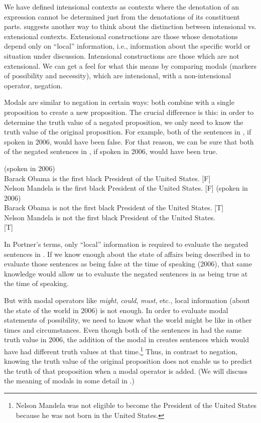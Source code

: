 We have defined intensional contexts as contexts where the denotation of an expression cannot be determined just from the denotations of its constituent parts. \citet[132]{Portner2005} suggests another way to think about the distinction between intensional vs. extensional contexts. Extensional constructions are those whose denotations depend only on “local” information, i.e., information about the specific world or situation under discussion. Intensional constructions are those which are not extensional. We can get a feel for what this means by comparing modals (markers of possibility and necessity), which are intensional, with a non-intensional operator, negation.


Modals are similar to negation in certain ways: both combine with a single proposition to create a new proposition. The crucial difference is this: in order to determine the truth value of a negated proposition, we only need to know the truth value of the original proposition. For example, both of the sentences in , if spoken in 2006, would have been false. For that reason, we can be sure that both of the negated sentences in , if spoken in 2006, would have been true.


\ea \label{ex:15.21}
(spoken in 2006)\\
\ea  Barack Obama is the first black President of the United States. \hfill  [F]\\
\ex Nelson Mandela is the first black President of the United States.  \hfill [F]
                       \z
\ex \label{ex:15.22}
(spoken in 2006) \\
\ea  Barack Obama is not the first black President of the United States. \hfill [T]\\
\ex Nelson Mandela is not the first black President of the United States. \\  \hfill [T]
                       \z
\z

In Portner's terms, only “local” information is required to evaluate the negated sentences in . If we know enough about the state of affairs being described in  to evaluate those sentences as being false at the time of speaking (2006), that same knowledge would allow us to evaluate the negated sentences in  as being true at the time of speaking.


But with modal operators like \textit{might}, \textit{could}, \textit{must}, etc., local information (about the state of the world in 2006) is not enough. In order to evaluate modal statements of possibility, we need to know what the world might be like in other times and circumstances. Even though both of the sentences in  had the same truth value in 2006, the addition of the modal in  creates sentences which would have had different truth values at that time.\footnote{Nelson Mandela was not eligible to become the President of the United States because he was not born in the United States.} Thus, in contrast to negation, knowing the truth value of the original proposition does not enable us to predict the truth of that proposition when a modal operator is added.   (We will discuss the meaning of modals in some detail in .)


